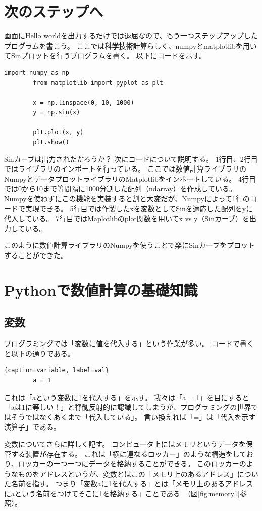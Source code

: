 \documentclass[]{article}
\begin{document}
	\section{次のステップへ}
	画面にHello worldを出力するだけでは退屈なので、もう一つステップアップしたプログラムを書こう。
	ここでは科学技術計算らしく、numpyとmatplotlibを用いてSinプロットを行うプログラムを書く。
	以下にコードを示す。
	\begin{lstlisting}[caption=sin curve, label=sin]
		import numpy as np
		from matplotlib import pyplot as plt

		x = np.linspace(0, 10, 1000)
		y = np.sin(x)

		plt.plot(x, y)
		plt.show()

	\end{lstlisting}
	Sinカーブは出力されただろうか？
	次にコードについて説明する。
	1行目、2行目ではライブラリのインポートを行っている。
	ここでは数値計算ライブラリのNumpyとデータプロットライブラリのMatplotlibをインポートしている。
	4行目では0から10まで等間隔に1000分割した配列（ndarray）を作成している。
	Numpyを使わずにこの機能を実装すると割と大変だが、Numpyによって1行のコードで実現できる。
	5行目では作製したxを変数としてSinを適応した配列をyに代入している。
	7行目ではMaplotlibのplot関数を用いてx vs y（Sinカーブ）を出力している。

	このように数値計算ライブラリのNumpyを使うことで楽にSinカーブをプロットすることができた。

	\section{Pythonで数値計算の基礎知識}
	\subsection{変数}
	プログラミングでは「変数に値を代入する」という作業が多い。
	コードで書くと以下の通りである。
	\begin{lstlisting}{caption=variable, label=val}
		a = 1
	\end{lstlisting}
	これは「aという変数に1を代入する」を示す。
	我々は「a = 1」を目にすると「aは1に等しい！」と脊髄反射的に認識してしまうが、プログラミングの世界ではそうではなくあくまで「代入している」。
	言い換えれば「=」は「代入を示す演算子」である。

	変数についてさらに詳しく記す。
	コンピュータ上にはメモリというデータを保管する装置が存在する。
	これは「横に連なるロッカー」のような構造をしており、ロッカーの一つ一つにデータを格納することができる。
	このロッカーのようなものをアドレスというが、変数とはこの「メモリ上のあるアドレス」についた名前を指す。
	つまり「変数aに1を代入する」とは「メモリ上のあるアドレスにaという名前をつけてそこに1を格納する」ことである~（図\ref{fig:memory1}参照）。
\end{document}
